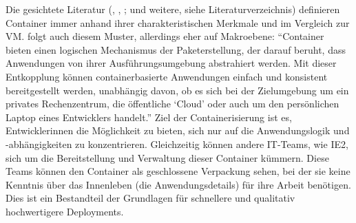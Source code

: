 Die gesichtete Literatur (\cite{pahl_containerization_2015}, \cite{bernstein_containers_2014}, \cite{kharb_automated_2016}; \cite{combe_docker_2016} und weitere, siehe Literaturverzeichnis) definieren Container immer anhand ihrer charakteristischen Merkmale und im Vergleich zur \ac{VM}. \cite{google_ireland_limited_container_2020} folgt auch diesem Muster, allerdings eher auf Makroebene: \enquote{Container bieten einen logischen Mechanismus der Paketerstellung, der darauf beruht, dass Anwendungen von ihrer Ausführungsumgebung abstrahiert werden. Mit dieser Entkopplung können containerbasierte Anwendungen einfach und konsistent bereitgestellt werden, unabhängig davon, ob es sich bei der Zielumgebung um ein privates Rechenzentrum, die öffentliche \enquote{Cloud} oder auch um den persönlichen Laptop eines Entwicklers handelt.}\autocite[][]{google_ireland_limited_container_2020} Ziel der Containerisierung ist es, Entwicklerinnen die Möglichkeit zu bieten, sich nur auf die Anwendungslogik und -abhängigkeiten zu konzentrieren. Gleichzeitig können andere IT-Teams, wie \ac{IE2}, sich um die Bereitstellung und Verwaltung dieser Container kümmern. Diese Teams können den Container als geschlossene Verpackung sehen, bei der sie keine Kenntnis über das Innenleben (die Anwendungsdetails) für ihre Arbeit benötigen.\autocite[vgl.][]{google_ireland_limited_container_2020} Dies ist ein Bestandteil der Grundlagen für schnellere und qualitativ hochwertigere Deployments.\autocite[vgl.][S.\,1]{kharb_automated_2016} \par
